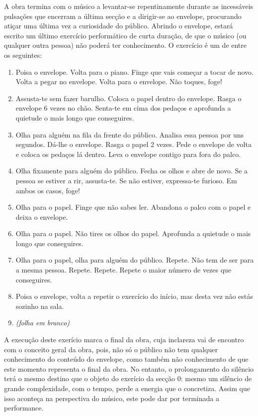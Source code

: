 \documentclass[../main.tex]{subfiles}
\begin{document}
A obra termina com o músico a levantar-se repentinamente durante as incessáveis pulsações que encerram a última secção e a dirigir-se ao envelope, procurando atiçar uma última vez a curiosidade do público. Abrindo o envelope, estará escrito um último exercício performático de curta duração, de que o músico (ou qualquer outra pessoa) não poderá ter conhecimento. O exercício é um de entre os seguintes:
\begin{enumerate}
    \item Poisa o envelope. Volta para o piano. Finge que vais começar a tocar de novo. Volta a pegar no envelope. Volta para o envelope. Não toques, foge!
    \item Assusta-te sem fazer barulho. Coloca o papel dentro do envelope. Rasga o envelope 6 vezes no chão. Senta-te em cima dos pedaços e aprofunda a quietude o mais longo que conseguires.
    \item Olha para alguém na fila da frente do público. Analisa essa pessoa por uns segundos. Dá-lhe o envelope. Rasga o papel 2 vezes. Pede o envelope de volta e coloca os pedaços lá dentro. Leva o envelope contigo para fora do palco.
    \item Olha fixamente para alguém do público. Fecha os olhos e abre de novo. Se a pessoa se estiver a rir, assusta-te. Se não estiver, expressa-te furioso. Em ambos os casos, foge!
    \item Olha para o papel. Finge que não sabes ler. Abandona o palco com o papel e deixa o envelope.
    \item Olha para o papel. Não tires os olhos do papel. Aprofunda a quietude o mais longo que conseguires.
    \item Olha para o papel, olha para alguém do público. Repete. Não tem de ser para a mesma pessoa. Repete. Repete. Repete o maior número de vezes que conseguires.
    \item Poisa o envelope, volta a repetir o exercício do início, mas desta vez não estás sozinho na sala.
    \item \textsl{(folha em branco)}
\end{enumerate}

A execução deste exerício marca o final da obra, cuja inclareza vai de encontro com o conceito geral da obra, pois, não só o público não tem qualquer conhecimento do conteúdo do envelope, como também não conhecimento de que este momento representa o final da obra. No entanto, o prolongamento do silêncio terá o mesmo destino que o objeto do exerício da secção 0: mesmo um silêncio de grande complexidade, com o tempo, perde a energia que o concretiza. Assim que isso aconteça na perspectiva do músico, este pode dar por terminada a performance.
\end{document}
